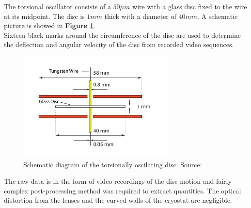 The torsional oscillator consists of a $50 \mu\unit{m}$ wire  with a glass disc fixed to
the wire at its midpoint. The disc is $1\unit{mm}$ thick with a diameter of $40\unit{mm}$. A schematic picture is showed in \textbf{Figure \ref{disc}}.\\
Sixteen black marks around the circumference of the disc are used to determine the deflection and angular velocity of the disc from recorded video sequences.

\begin{figure}[h]
	\centering
	\includegraphics[width=0.7\textwidth]{graphics/exp/disc}
	\caption{Schematic diagram of the torsionally oscilating disc. Source: \cite{universal_scaling}}
	\label{disc}
\end{figure}

The raw data is in the form of video recordings of the disc motion and fairly complex post-processing method was required to extract quantities. The optical distortion from the lenses and the curved walls of the cryostat are negligible.

\newpage
